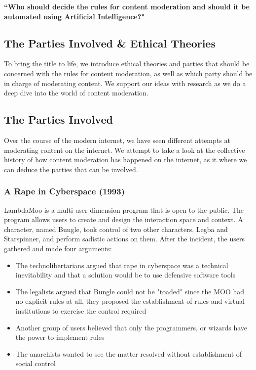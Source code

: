 \documentclass[a4paper]{article}
\begin{document}
\textbf{``Who should decide the rules for content moderation and should it be automated using Artificial Intelligence?"}

\subsection{The Parties Involved \& Ethical Theories}
To bring the title to life, we introduce ethical theories and parties that should be concerned with the rules for 
content moderation, as well as which party should be in charge of moderating content. We support our ideas with research 
as we do a deep dive into the world of content moderation.

\subsection{The Parties Involved}
Over the course of the modern internet, we have seen different attempts at moderating content on the internet. We 
attempt to take a look at the collective history of how content moderation has happened on the internet, as it where
we can deduce the parties that can be involved.

\subsubsection{A Rape in Cyberspace (1993)}
LambdaMoo is a multi-user dimension program that is open to the public. The program allows users to create and design
the interaction space and context. A character, named Bungle, took control of two other characters, Legba and 
Starspinner, and perform sadistic actions on them. After the incident, the users gathered and made four arguments:

\begin{itemize}
    \item The technolibertarians argued that rape in cyberspace was a technical inevitability and that a solution would
    be to use defensive software tools
    \item The legalists argued that Bungle could not be "toaded" since the MOO had no explicit rules at all, they 
    proposed the establishment of rules and virtual institutions to exercise the control required
    \item Another group of users believed that only the programmers, or wizards have the power to implement rules
    \item The anarchists wanted to see the matter resolved without establishment of social control
\end{itemize}
\end{document}
